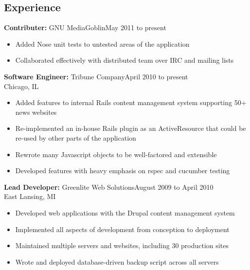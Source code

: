\documentclass[11pt]{res}
\begin{document}


\begin{resume}


\section{Experience}
{\bf Contributer:} GNU MediaGoblin\dotfill May 2011 to present
\begin{itemize}
\item Added Nose unit tests to untested areas of the application
\item Collaborated effectively with distributed team over IRC and mailing lists
\end{itemize}

{\bf Software Engineer:} Tribune Company\dotfill April 2010 to present\\
Chicago, IL
\begin{itemize}
\item Added features to internal Rails content management system
      supporting 50\footnotesize{+} \normalsize news websites
\item Re-implemented an in-house Rails plugin as an ActiveResource that could
      be re-used by other parts of the application
\item Rewrote many Javascript objects to be well-factored and extensible
\item Developed features with heavy emphasis on rspec and cucumber testing
\end{itemize}

{\bf Lead Developer:} Greenlite Web Solutions\dotfill August 2009 to April 2010\\
East Lansing, MI
\begin{itemize}
\item Developed web applications with the Drupal content management system
\item Implemented all aspects of development from conception to deployment
\item Maintained multiple servers and websites, including 30 production sites
\item Wrote and deployed database-driven backup script across all servers
\end{itemize}


\end{resume}
\end{document}
